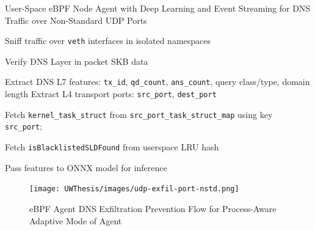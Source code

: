 \documentclass [11pt, proquest] {uwthesis}[2020/02/24]
\begin{document}
\begin{algorithm}[H]
\caption{User-Space eBPF Node Agent with Deep Learning and Event Streaming for DNS Traffic over Non-Standard UDP Ports}
\label{sec:alg6}

\small %


Sniff traffic over \texttt{veth} interfaces in isolated namespaces\;

Verify DNS Layer in packet SKB data


Extract DNS L7 features: \texttt{tx\_id}, \texttt{qd\_count}, \texttt{ans\_count}, query class/type, domain length\;
Extract L4 transport ports: \texttt{src\_port}, \texttt{dest\_port}\;

Fetch \texttt{kernel\_task\_struct} from \texttt{src\_port\_task\_struct\_map} using key \texttt{src\_port};

Fetch \texttt{isBlacklistedSLDFound} from userspace LRU hash\;

Pass features to ONNX model for inference\;
\end{algorithm}



\label{sec:data_plane_non_standard_port}
\begin{figure}[H]
\texttt{[image: UWThesis/images/udp-exfil-port-nstd.png]}
\caption{eBPF Agent DNS Exfiltration Prevention Flow for Process-Aware Adaptive Mode of Agent}
\end{figure}
\end{document}
